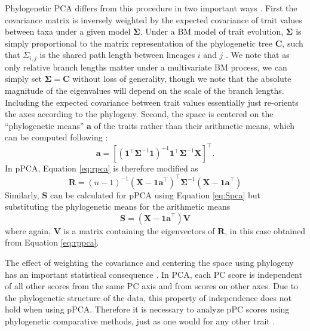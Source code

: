 \documentclass[a4paper,11pt]{article}
\begin{document}
Phylogenetic PCA differs from this procedure in two important ways \citep{Revell2008,Polly2013} . First the covariance matrix is inversely weighted by the expected covariance of trait values between taxa under a given model $\mathbf{\Sigma}$. Under a BM model of trait evolution, $\mathbf{\Sigma}$ is simply proportional to the matrix representation of the phylogenetic tree $\mathbf{C}$, such that $\Sigma_{i,j}$ is the shared path length between lineages $i$ and $j$ \citep{Rohlf2001}. We note that as only relative branch lengths matter under a multivariate BM process, we can simply set $\mathbf{\Sigma}=\mathbf{C}$ without loss of generality, though we note that the absolute magnitude of the eigenvalues will depend on the scale of the branch lengths. Including the expected covariance between trait values essentially just re-orients the axes according to the phylogeny. Second, the space is centered on the ``phylogenetic means'' $\mathbf{a}$ of the traits rather than their arithmetic means, which can be computed following \citet{RevellHarmon2008}:
\begin{equation}\label{eq:phymean}
\mathbf{a}=[(\mathbf{1}^\intercal \mathbf{\Sigma}^{-1} \mathbf{1})^{-1} 
\mathbf{1}^\intercal \mathbf{\Sigma}^{-1} \mathbf{X}]^\intercal.
\end{equation}
In pPCA, Equation \ref{eq:rpca} is therefore modified as
\begin{equation}\label{eq:rppca}
\mathbf{R} = (n-1)^{-1}(\mathbf{X} - \mathbf{1a}^\intercal)^\intercal \mathbf{\Sigma}^{-1} (\mathbf{X} - \mathbf{1a}^\intercal)
\end{equation}
Similarly, $\mathbf{S}$ can be calculated for pPCA using Equation \ref{eq:Spca} but substituting the phylogenetic means for the arithmetic means
\begin{equation}\label{eq:Sppca}
\mathbf{S}=(\mathbf{X} - \mathbf{1a}^\intercal)\mathbf{V}
\end{equation}
where again, $\mathbf{V}$ is a matrix containing the eigenvectors of $\mathbf{R}$, in this case obtained from Equation \ref{eq:rppca}.

The effect of weighting the covariance and centering the space using phylogeny has an important statistical consequence \citep{Revell2008, Polly2013}. In PCA, each PC score is independent of all other scores from the same PC axis and from scores on other axes. Due to the phylogenetic structure of the data, this property of independence does not hold when using pPCA. Therefore it is necessary to analyze pPC scores using phylogenetic comparative methods, just as one would for any other trait \citep{Revell2008, Polly2013}. 
\end{document}
